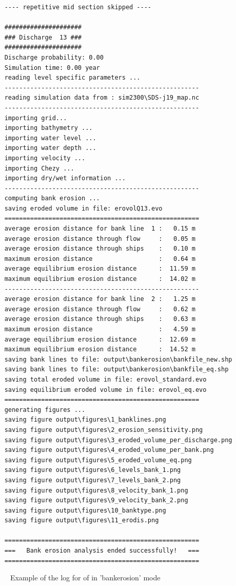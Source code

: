 \begin{Verbatim}
	---- repetitive mid section skipped ----
	
	#####################
	### Discharge  13 ###
	#####################
	Discharge probability: 0.00
	Simulation time: 0.00 year
	reading level specific parameters ...
	-----------------------------------------------------
	reading simulation data from : sim2300\SDS-j19_map.nc
	-----------------------------------------------------
	importing grid...
	importing bathymetry ...
	importing water level ...
	importing water depth ...
	importing velocity ...
	importing Chezy ...
	importing dry/wet information ...
	-----------------------------------------------------
	computing bank erosion ...
	saving eroded volume in file: erovolQ13.evo
	=====================================================
	average erosion distance for bank line  1 :   0.15 m
	average erosion distance through flow     :   0.05 m
	average erosion distance through ships    :   0.10 m
	maximum erosion distance                  :   0.64 m
	average equilibrium erosion distance      :  11.59 m
	maximum equilibrium erosion distance      :  14.02 m
	-----------------------------------------------------
	average erosion distance for bank line  2 :   1.25 m
	average erosion distance through flow     :   0.62 m
	average erosion distance through ships    :   0.63 m
	maximum erosion distance                  :   4.59 m
	average equilibrium erosion distance      :  12.69 m
	maximum equilibrium erosion distance      :  14.52 m
	saving bank lines to file: output\bankerosion\bankfile_new.shp
	saving bank lines to file: output\bankerosion\bankfile_eq.shp
	saving total eroded volume in file: erovol_standard.evo
	saving equilibrium eroded volume in file: erovol_eq.evo
	=====================================================
	generating figures ...
	saving figure output\figures\1_banklines.png
	saving figure output\figures\2_erosion_sensitivity.png
	saving figure output\figures\3_eroded_volume_per_discharge.png
	saving figure output\figures\4_eroded_volume_per_bank.png
	saving figure output\figures\5_eroded_volume_eq.png
	saving figure output\figures\6_levels_bank_1.png
	saving figure output\figures\7_levels_bank_2.png
	saving figure output\figures\8_velocity_bank_1.png
	saving figure output\figures\9_velocity_bank_2.png
	saving figure output\figures\10_banktype.png
	saving figure output\figures\11_erodis.png
	
	=====================================================
	===   Bank erosion analysis ended successfully!   ===
	=====================================================
\end{Verbatim}
\begin{figure}[!h]
	\caption{Example of the log for of \dfastbe in 'bankerosion' mode}
	\label{logbankerosion}
\end{figure}

